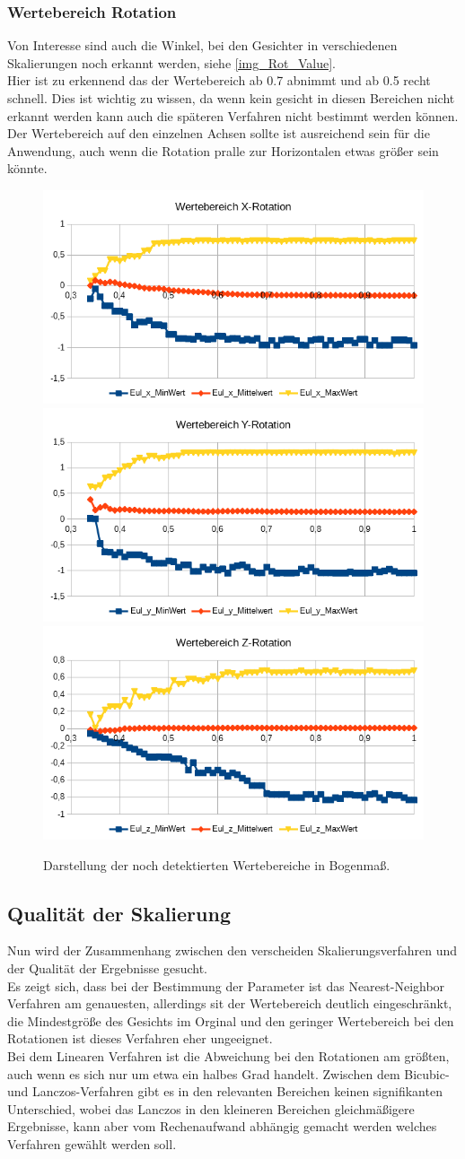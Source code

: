 \subsubsection{Wertebereich Rotation}
Von Interesse sind auch die Winkel, bei den Gesichter in verschiedenen Skalierungen noch erkannt werden, siehe \autoref{img_Rot_Value}.\\
Hier ist zu erkennend das der Wertebereich ab 0.7 abnimmt und ab 0.5 recht schnell. Dies ist wichtig zu wissen, da wenn kein gesicht in diesen Bereichen nicht erkannt werden kann auch die späteren Verfahren nicht bestimmt werden können.\\
Der Wertebereich auf den einzelnen Achsen sollte ist ausreichend sein für die Anwendung, auch wenn die Rotation pralle zur Horizontalen etwas größer sein könnte.
\begin{figure}
	\centering
	\includegraphics[width=0.3\linewidth]{tabelle/X_Rot}
	\includegraphics[width=0.3\linewidth]{tabelle/Y_Rot}
	\includegraphics[width=0.3\linewidth]{tabelle/Z_Rot}
	\caption{Darstellung der noch detektierten Wertebereiche in Bogenmaß.}
	\label{img_Rot_Value}
\end{figure}
\subsection{Qualität der Skalierung}
Nun wird der Zusammenhang zwischen den verscheiden Skalierungsverfahren und der Qualität der Ergebnisse gesucht.\\
Es zeigt sich, dass bei der Bestimmung der Parameter ist das Nearest-Neighbor Verfahren am genauesten, allerdings sit der Wertebereich deutlich eingeschränkt, die Mindestgröße des Gesichts im Orginal und den geringer Wertebereich bei den Rotationen ist dieses Verfahren eher ungeeignet.\\
Bei dem Linearen Verfahren ist die Abweichung bei den Rotationen am größten, auch wenn es sich nur um etwa ein halbes Grad handelt. Zwischen dem Bicubic- und Lanczos-Verfahren gibt es in den relevanten Bereichen keinen signifikanten Unterschied, wobei das Lanczos in den kleineren Bereichen gleichmäßigere Ergebnisse, kann aber vom Rechenaufwand abhängig gemacht werden welches Verfahren gewählt werden soll. 
